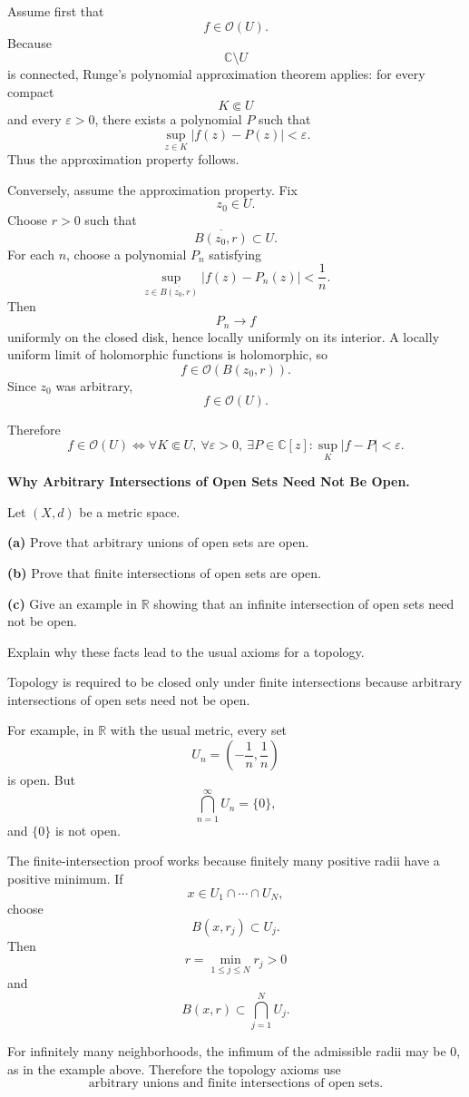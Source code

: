 \begin{solution}
Assume first that
\[
f\in\mathcal O(U).
\]
Because
\[
\mathbb C\setminus U
\]
is connected, Runge's polynomial approximation theorem applies: for every compact
\[
K\Subset U
\]
and every \(\varepsilon>0\), there exists a polynomial \(P\) such that
\[
\sup_{z\in K}|f(z)-P(z)|<\varepsilon.
\]
Thus the approximation property follows.

Conversely, assume the approximation property. Fix
\[
z_0\in U.
\]
Choose \(r>0\) such that
\[
\overline{B(z_0,r)}\subset U.
\]
For each \(n\), choose a polynomial \(P_n\) satisfying
\[
\sup_{z\in\overline{B(z_0,r)}}
|f(z)-P_n(z)|
<
\frac1n.
\]
Then
\[
P_n\to f
\]
uniformly on the closed disk, hence locally uniformly on its interior. A locally uniform
limit of holomorphic functions is holomorphic, so
\[
f\in\mathcal O(B(z_0,r)).
\]
Since \(z_0\) was arbitrary,
\[
f\in\mathcal O(U).
\]

Therefore
\[
\boxed{
f\in\mathcal O(U)
\iff
\forall K\Subset U,\ \forall\varepsilon>0,\ 
\exists P\in\mathbb C[z]:
\sup_K|f-P|<\varepsilon.
}
\]
\end{solution}


\begin{problem}[CP-II-0533]
\label{prob:cp-ii-0533}
\textbf{Why Arbitrary Intersections of Open Sets Need Not Be Open.}

\hspace*{1.5em}Let \((X,d)\) be a metric space.

\par\smallskip\noindent\textbf{(a)}\quad
Prove that arbitrary unions of open sets are open.

\par\smallskip\noindent\textbf{(b)}\quad
Prove that finite intersections of open sets are open.

\par\smallskip\noindent\textbf{(c)}\quad
Give an example in \(\mathbb R\) showing that an infinite intersection of
open sets need not be open.

Explain why these facts lead to the usual axioms for a topology.
\end{problem}

\begin{solution}
Topology is required to be closed only under finite intersections because arbitrary
intersections of open sets need not be open.

For example, in \(\mathbb R\) with the usual metric, every set
\[
U_n=\left(-\frac1n,\frac1n\right)
\]
is open. But
\[
\bigcap_{n=1}^{\infty}U_n
=
\{0\},
\]
and \(\{0\}\) is not open.

The finite-intersection proof works because finitely many positive radii have a positive
minimum. If
\[
x\in U_1\cap\cdots\cap U_N,
\]
choose
\[
B(x,r_j)\subset U_j.
\]
Then
\[
r=\min_{1\le j\le N}r_j>0
\]
and
\[
B(x,r)\subset\bigcap_{j=1}^{N}U_j.
\]

For infinitely many neighborhoods, the infimum of the admissible radii may be \(0\), as in
the example above. Therefore the topology axioms use
\[
\boxed{\text{arbitrary unions and finite intersections of open sets}.}
\]
\end{solution}


